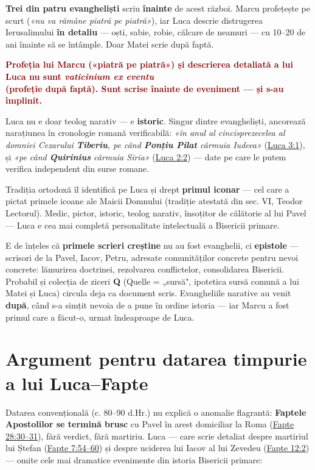\documentclass[12pt,a4paper,twoside,openany]{book}
\begin{document}
\textbf{Trei din patru evangheliști} scriu \textbf{înainte} de acest război. Marcu profețește pe scurt (\textit{«nu va rămâne piatră pe piatră»}), iar Luca descrie distrugerea Ierusalimului \textbf{în detaliu} — oști, sabie, robie, călcare de neamuri — cu 10–20 de ani înainte să se întâmple. Doar Matei scrie după faptă.

\textcolor{darkred}{\textbf{Profeția lui Marcu («piatră pe piatră») și descrierea detaliată a lui Luca nu sunt \textit{vaticinium ex eventu} \\
(profeție după faptă). Sunt scrise înainte de eveniment — și s-au împlinit.}}

Luca nu e doar teolog narativ — e \textbf{istoric}. Singur dintre evangheliști, ancorează narațiunea în cronologie romană verificabilă: \textit{«în anul al cincisprezecelea al domniei Cezarului \textbf{Tiberiu}, pe când \textbf{Ponțiu Pilat} cârmuia Iudeea»} (\href{https://bibliaortodoxa.ro/carte.php?id=48\&cap=3\#1}{Luca 3:1}), și \textit{«pe când \textbf{Quirinius} cârmuia Siria»} (\href{https://bibliaortodoxa.ro/carte.php?id=48\&cap=2\#2}{Luca 2:2}) — date pe care le putem verifica independent din surse romane.

Tradiția ortodoxă îl identifică pe Luca și drept \textbf{primul iconar} — cel care a pictat primele icoane ale Maicii Domnului (tradiție atestată din sec. VI, Teodor Lectorul). Medic, pictor, istoric, teolog narativ, însoțitor de călătorie al lui Pavel — Luca e cea mai completă personalitate intelectuală a Bisericii primare.

E de înțeles că \textbf{primele scrieri creștine} nu au fost evanghelii, ci \textbf{epistole} — scrisori de la Pavel, Iacov, Petru, adresate comunităților concrete pentru nevoi concrete: lămurirea doctrinei, rezolvarea conflictelor, consolidarea Bisericii. Probabil și colecția de ziceri \textbf{Q} (Quelle = „sursă", ipotetica sursă comună a lui Matei și Luca) circula deja ca document scris. Evangheliile narative au venit \textbf{după}, când s-a simțit nevoia de a pune în ordine istoria — iar Marcu a fost primul care a făcut-o, urmat îndeaproape de Luca.


\section{Argument pentru datarea timpurie a lui Luca–Fapte}
Datarea convențională (c. 80–90 d.Hr.) nu explică o anomalie flagrantă: \textbf{Faptele Apostolilor se termină brusc} cu Pavel în arest domiciliar la Roma (\href{https://bibliaortodoxa.ro/carte.php?id=26\&cap=28\#30}{Fapte 28:30–31}), fără verdict, fără martiriu. Luca — care scrie detaliat despre martiriul lui Ștefan (\href{https://bibliaortodoxa.ro/carte.php?id=26\&cap=7\#54}{Fapte 7:54–60}) și despre uciderea lui Iacov al lui Zevedeu (\href{https://bibliaortodoxa.ro/carte.php?id=26\&cap=12\#2}{Fapte 12:2}) — omite cele mai dramatice evenimente din istoria Bisericii primare:
\end{document}
